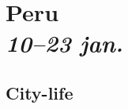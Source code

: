 \clearpage
\section*{Peru \\ {\footnotesize \textit{10--23 jan.}}}
\begin{figure}[!h]
	\centering
\noindent{}
	\caption*{}
\label{fig:coverphoto}
\end{figure}

\begin{figure}[!h]
	\centering
\noindent{}
	\caption*{}
\label{fig:coverphoto}
\end{figure}
\clearpage
\subsection*{City-life}



